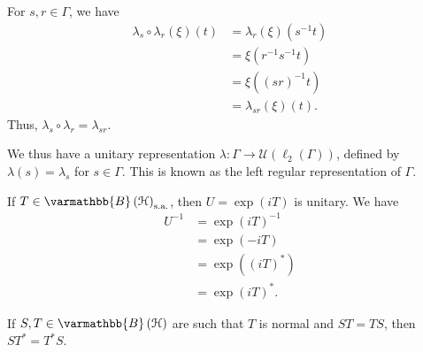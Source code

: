 \documentclass[10pt]{mypackage}
\renewcommand*{\mathbb}[1]{\varmathbb{#1}}
\newcommand{\sa}{\text{s.a.}}
\newcommand{\B}{\mathbb{B}}
\begin{document}
\begin{example}
  For $s,r\in \Gamma$, we have
  \begin{align*}
    \lambda_s\circ \lambda_r\left(\xi\right)\left(t\right) &= \lambda_r\left(\xi\right)\left(s^{-1}t\right)\\
                                                           &= \xi\left(r^{-1}s^{-1}t\right)\\
                                                           &= \xi\left(\left(sr\right)^{-1}t\right)\\
                                                           &= \lambda_{sr}\left(\xi\right)\left(t\right).
  \end{align*}
  Thus, $\lambda_s\circ \lambda_r = \lambda_{sr}$.\newline

  We thus have a unitary representation $\lambda: \Gamma\rightarrow \mathcal{U}\left(\ell_2\left(\Gamma\right)\right)$, defined by $\lambda(s) = \lambda_s$ for $s\in \Gamma$. This is known as the left regular representation of $\Gamma$.
\end{example}
\begin{example}
  If $T\in \B\left(\mathcal{H}\right)_{\sa}$, then $U = \exp(iT)$ is unitary. We have
  \begin{align*}
    U^{-1} &= \exp\left(iT\right)^{-1}\\
           &= \exp\left(-iT\right)\\
           &= \exp\left(\left(iT\right)^{\ast}\right)\\
           &= \exp\left(iT\right)^{\ast}.
  \end{align*}
\end{example}
\begin{theorem}
  If $S,T\in \B\left(\mathcal{H}\right)$ are such that $T$ is normal and $ST = TS$, then $ST^{\ast} = T^{\ast}S$.
\end{theorem}
\end{document}
